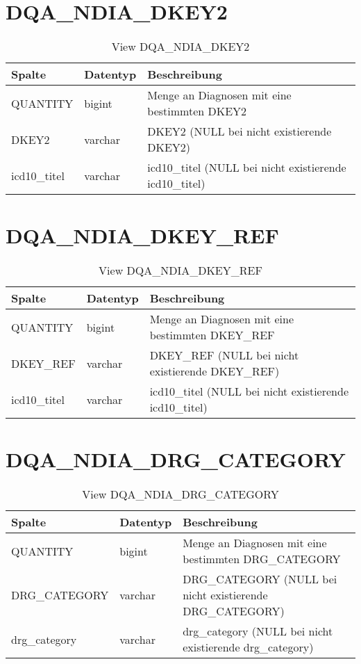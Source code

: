   \section{DQA\_NDIA\_DKEY2}

  \begin{table}[ht]
    \centering
    \caption{View DQA\_NDIA\_DKEY2}
    \label{tab:dqandiadkey2}
    \begin{tabular}{||l|l|p{10cm}||}
      \hline
      Spalte & Datentyp & Beschreibung \\ [0.5ex] \hline \hline
QUANTITY & bigint & Menge an Diagnosen mit eine bestimmten DKEY2 \\ \hline
DKEY2 & varchar & DKEY2 (NULL bei nicht existierende DKEY2)\\ \hline
icd10\_titel & varchar & icd10\_titel (NULL bei nicht existierende icd10\_titel)\\ \hline
    \end{tabular}
  \end{table}
 \clearpage
  \section{DQA\_NDIA\_DKEY\_REF}

  \begin{table}[ht]
    \centering
    \caption{View DQA\_NDIA\_DKEY\_REF}
    \label{tab:dqandiadkeyref}
    \begin{tabular}{||l|l|p{10cm}||}
      \hline
      Spalte & Datentyp & Beschreibung \\ [0.5ex] \hline \hline
QUANTITY & bigint & Menge an Diagnosen mit eine bestimmten DKEY\_REF \\ \hline
DKEY\_REF & varchar & DKEY\_REF (NULL bei nicht existierende DKEY\_REF)\\ \hline
icd10\_titel & varchar & icd10\_titel (NULL bei nicht existierende icd10\_titel)\\ \hline
    \end{tabular}
  \end{table}
 \clearpage
  \section{DQA\_NDIA\_DRG\_CATEGORY}

  \begin{table}[ht]
    \centering
    \caption{View DQA\_NDIA\_DRG\_CATEGORY}
    \label{tab:dqandiadrgcategory}
    \begin{tabular}{||l|l|p{10cm}||}
      \hline
      Spalte & Datentyp & Beschreibung \\ [0.5ex] \hline \hline
QUANTITY & bigint & Menge an Diagnosen mit eine bestimmten DRG\_CATEGORY \\ \hline
DRG\_CATEGORY & varchar & DRG\_CATEGORY (NULL bei nicht existierende DRG\_CATEGORY)\\ \hline
drg\_category & varchar & drg\_category (NULL bei nicht existierende drg\_category)\\ \hline
    \end{tabular}
  \end{table}
 \clearpage
